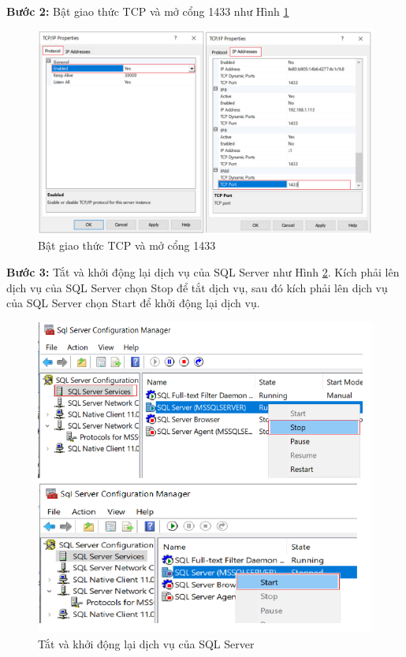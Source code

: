    \textbf{Bước 2:} Bật giao thức TCP và mở cổng 1433 như Hình \ref{hinh33_4}
  	\begin{figure}[!ht]
	\centering
	\includegraphics[scale=0.5]{Figures//Hinh33_4.png}
	\caption{ Bật giao thức TCP và mở cổng 1433 }\label{hinh33_4} 
\end{figure}

\textbf{Bước 3:} Tắt và khởi động lại dịch vụ của SQL Server như Hình \ref{hinh33_5}. Kích phải lên dịch vụ của SQL Server chọn Stop để tắt dịch vụ, sau đó  kích phải lên dịch vụ của SQL Server chọn Start để khởi động lại dịch vụ.
\begin{figure}[!ht]
	\centering
	\includegraphics[scale=0.6]{Figures//Hinh33_5.png}
	\caption{ Tắt và khởi động lại dịch vụ của SQL Server}\label{hinh33_5} 
\end{figure}

